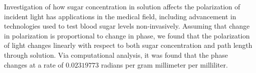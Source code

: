 Investigation of how sugar concentration in solution affects the polarization of incident light has applications in the medical field, including advancement in technologies used to test blood sugar levels non-invasively. Assuming that change in polarization is proportional to change in phase, we found that the polarization of light changes linearly with respect to both sugar concentration and path length through solution. Via computational analysis, it was found that the phase changes at a rate of $0.02319773$ radians per gram millimeter per milliliter. 
